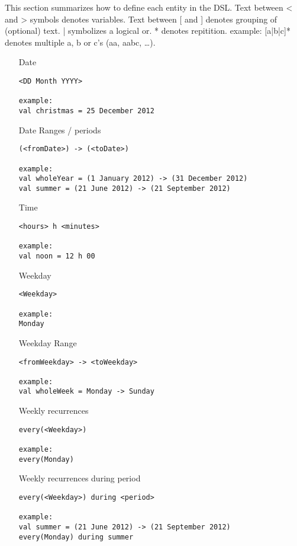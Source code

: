 This section summarizes how to define each entity in the DSL.
Text between < and > symbols denotes variables.
Text between [ and ] denotes grouping of (optional) text. | symbolizes a logical or. * denotes repitition.
example: [a|b|c]* denotes multiple a, b or c's (aa, aabc, \dots).

\begin{itemize}

\item[Date]
\begin{lstlisting}
<DD Month YYYY>

example:
val christmas = 25 December 2012
\end{lstlisting}
		
\item[Date Ranges / periods]
\begin{lstlisting}
(<fromDate>) -> (<toDate>)

example:
val wholeYear = (1 January 2012) -> (31 December 2012)
val summer = (21 June 2012) -> (21 September 2012)
\end{lstlisting}
		
\item[Time]
\begin{lstlisting}
<hours> h <minutes>

example:
val noon = 12 h 00
\end{lstlisting}

\item[Weekday]
\begin{lstlisting}
<Weekday>

example:
Monday
\end{lstlisting}
	    
\item[Weekday Range]
\begin{lstlisting}
<fromWeekday> -> <toWeekday>

example:
val wholeWeek = Monday -> Sunday
\end{lstlisting}

	    
\item[Weekly recurrences]
\begin{lstlisting}
every(<Weekday>)

example:
every(Monday)
\end{lstlisting}
	    
\item[Weekly recurrences during period]
\begin{lstlisting}
every(<Weekday>) during <period>
 
example:
val summer = (21 June 2012) -> (21 September 2012)
every(Monday) during summer
\end{lstlisting}


\end{itemize}
